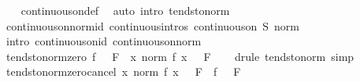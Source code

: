 \begin{isabellebody}
%
\isadelimproof
\ \ %
\endisadelimproof
%
\isatagproof
{}\isamarkupfalse%
\ continuous{\isacharunderscore}{\kern0pt}on{\isacharunderscore}{\kern0pt}def\ \isamarkupfalse%
\ {\isacharparenleft}{\kern0pt}auto\ intro{\isacharcolon}{\kern0pt}\ tendsto{\isacharunderscore}{\kern0pt}norm{\isacharparenright}{\kern0pt}%
\endisatagproof
{\isafoldproof}%
%
\isadelimproof
\isanewline
%
\endisadelimproof
\isanewline
{}\isamarkupfalse%
\ continuous{\isacharunderscore}{\kern0pt}on{\isacharunderscore}{\kern0pt}norm{\isacharunderscore}{\kern0pt}id\ {\isacharbrackleft}{\kern0pt}continuous{\isacharunderscore}{\kern0pt}intros{\isacharbrackright}{\kern0pt}{\isacharcolon}{\kern0pt}\ {\isachardoublequoteopen}continuous{\isacharunderscore}{\kern0pt}on\ S\ norm{\isachardoublequoteclose}\isanewline
%
\isadelimproof
\ \ %
\endisadelimproof
%
\isatagproof
{}\isamarkupfalse%
\ {\isacharparenleft}{\kern0pt}intro\ continuous{\isacharunderscore}{\kern0pt}on{\isacharunderscore}{\kern0pt}id\ continuous{\isacharunderscore}{\kern0pt}on{\isacharunderscore}{\kern0pt}norm{\isacharparenright}{\kern0pt}%
\endisatagproof
{\isafoldproof}%
%
\isadelimproof
\isanewline
%
\endisadelimproof
\isanewline
{}\isamarkupfalse%
\ tendsto{\isacharunderscore}{\kern0pt}norm{\isacharunderscore}{\kern0pt}zero{\isacharcolon}{\kern0pt}\ {\isachardoublequoteopen}{\isacharparenleft}{\kern0pt}f\ {\isasymlonglongrightarrow}\ {}{\isacharparenright}{\kern0pt}\ F\ {\isasymLongrightarrow}\ {\isacharparenleft}{\kern0pt}{\isacharparenleft}{\kern0pt}{\isasymlambda}x{\isachardot}{\kern0pt}\ norm\ {\isacharparenleft}{\kern0pt}f\ x{\isacharparenright}{\kern0pt}{\isacharparenright}{\kern0pt}\ {\isasymlonglongrightarrow}\ {}{\isacharparenright}{\kern0pt}\ F{\isachardoublequoteclose}\isanewline
%
\isadelimproof
\ \ %
\endisadelimproof
%
\isatagproof
{}\isamarkupfalse%
\ {\isacharparenleft}{\kern0pt}drule\ tendsto{\isacharunderscore}{\kern0pt}norm{\isacharparenright}{\kern0pt}\ simp%
\endisatagproof
{\isafoldproof}%
%
\isadelimproof
\isanewline
%
\endisadelimproof
\isanewline
{}\isamarkupfalse%
\ tendsto{\isacharunderscore}{\kern0pt}norm{\isacharunderscore}{\kern0pt}zero{\isacharunderscore}{\kern0pt}cancel{\isacharcolon}{\kern0pt}\ {\isachardoublequoteopen}{\isacharparenleft}{\kern0pt}{\isacharparenleft}{\kern0pt}{\isasymlambda}x{\isachardot}{\kern0pt}\ norm\ {\isacharparenleft}{\kern0pt}f\ x{\isacharparenright}{\kern0pt}{\isacharparenright}{\kern0pt}\ {\isasymlonglongrightarrow}\ {}{\isacharparenright}{\kern0pt}\ F\ {\isasymLongrightarrow}\ {\isacharparenleft}{\kern0pt}f\ {\isasymlonglongrightarrow}\ {}{\isacharparenright}{\kern0pt}\ F{\isachardoublequoteclose}\isanewline

\end{isabellebody}
